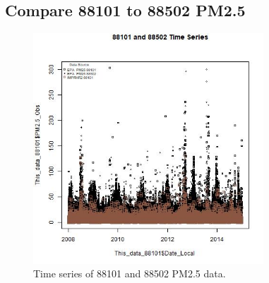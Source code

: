 
\subsection{Compare 88101 to 88502 PM2.5}
\begin{figure} 
\centering 
\includegraphics[width=0.77\textwidth]{Code_Outputs/TimeSeries_88101v88502.jpg} 
\caption{\label{fig:TS101v502}Time series of 88101 and 88502 PM2.5 data.} 
\end{figure} 
 
